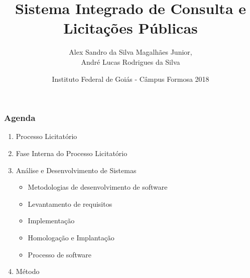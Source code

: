 \documentclass{beamer}
\title{Sistema Integrado de Consulta e Licitações Públicas}
\subtitle{Alex Sandro da Silva Magalhães Junior,\\ André Lucas Rodrigues da Silva}
\author{Instituto Federal de Goiás - Câmpus Formosa 2018}
\date{}
\begin{document}
	\setcounter{showProgressBar}{0}
	\setcounter{showSlideNumbers}{0}

	\frame{\titlepage}

	\begin{frame}
		\frametitle{Agenda}
		\begin{enumerate}
			\item Processo Licitatório\\ %
			\item Fase Interna do Processo Licitatório\\
			\item Análise e Desenvolvimento de Sistemas \\ %
			\begin{itemize}
				\item Metodologias de desenvolvimento de software\\ 
				\item Levantamento de requisitos\\ 
				\item Implementação\\ %
				\item Homologação e Implantação\\
				\item Processo de software\\
			\end{itemize}
			\item Método\\ 

\end{enumerate}
\end{frame}
\end{document}
